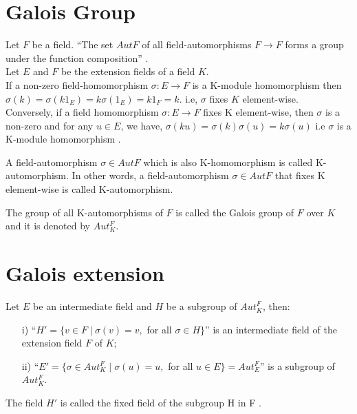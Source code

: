 \section{Galois Group}
Let \(F\) be a field. ``The set \(AutF\) of all field-automorphisms \(F \rightarrow F \) forms a group under the function composition'' \cite{hunger}.\\[3mm]
\noindent
Let \(E\) and \(F\) be the extension fields of a field \(K\).\\
If a non-zero field-homomorphism \(\sigma : E \rightarrow F\) is a K-module homomorphism then\\
\(\sigma(k)=\sigma(k1_E)=k\sigma(1_E)=k1_F=k\).\hspace{7mm}
i.e, \(\sigma\) fixes \(K\) element-wise.\\
Conversely, if a field homomorphism \(\sigma : E \rightarrow F\) fixes K element-wise, then \(\sigma\) is a non-zero and for any \(u \in E\), we have, \(\sigma(ku)=\sigma(k)\sigma(u)=k\sigma(u)\)
i.e \(\sigma\) is a K-module homomorphism \cite{hunger}.
\begin{definition} \cite{hunger}
  A field-automorphism \(\sigma \in Aut F\) which is also K-homomorphism is called K-automorphism. In other words, a field-automorphism \(\sigma \in Aut F\) that fixes K element-wise is called K-automorphism.
\end{definition}

\begin{definition} \cite{hunger}
  The group of all K-automorphisms of \(F\) is called the Galois group of \(F\) over \(K\) and it is denoted by \(Aut_K^F\).
\end{definition}

\section{Galois extension}
Let \(E\) be an intermediate field and \(H\) be a subgroup of \(Aut_K^F\), then:
\begin{enumerate}
\item[i)] ``\(H' = \{v \in F \; | \: \sigma(v)=v,\) for all \(\sigma \in H \}\)'' \cite{hunger} is an intermediate field of the extension field \(F\) of \(K\);
\item[ii)] ``\(E' = \{\sigma \in Aut_K^F \; | \; \sigma(u)=u,\) for all \(u \in E\}=Aut_E^F\)'' \cite{hunger} is a subgroup of \(Aut_K^F\).
\end{enumerate}

The field \(H'\) is called the fixed field of the subgroup H in F \cite{hunger}.

